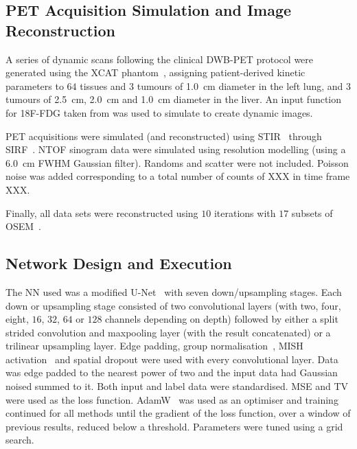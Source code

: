     \subsection{PET Acquisition Simulation and Image Reconstruction} \label{sec:pet_acquisition_simulation_and_image_reconstruction}
        A series of dynamic scans following the clinical \gls{DWB}-\gls{PET} protocol were generated using the \gls{XCAT} phantom~\cite{segars4DXCATPhantom2010}, assigning patient-derived kinetic parameters to $64$ tissues and $3$ tumours of \SI{1.0}{\centi\meter} diameter in the left lung, and $3$ tumours of \SI{2.5}{\centi\meter}, \SI{2.0}{\centi\meter} and \SI{1.0}{\centi\meter} diameter in the liver. An input function for \gls{18F-FDG} taken from \cite{langsjoEffectsSubanestheticKetamine2004} was used to simulate  to create dynamic images.

        \gls{PET} acquisitions were simulated (and reconstructed) using \gls{STIR}~\cite{Thielemans2012} through \gls{SIRF}~\cite{Ovtchinnikov2017}. \gls{NTOF} sinogram data were simulated using resolution modelling (using a \SI{6.0}{\centi\meter} \gls{FWHM} Gaussian filter). Randoms and scatter were not included. Poisson noise was added corresponding to a total number of counts of XXX in time frame XXX.

        Finally, all data sets were reconstructed using $10$ iterations with $17$ subsets of \gls{OSEM}~\cite{Hudson1994}.

    
    \subsection{Network Design and Execution} \label{sec:network_design_and_execution}
        The \gls{NN} used was a modified U-Net~\cite{Weng2015U-Net:Segmentation} with seven down/upsampling stages. Each down or upsampling stage consisted of two convolutional layers (with two, four, eight, $16$, $32$, $64$ or $128$ channels depending on depth) followed by either a split strided convolution and maxpooling layer (with the result concatenated) or a trilinear upsampling layer. Edge padding, group normalisation~\cite{Wu2018GroupNormalization}, MISH activation~\cite{Misra2020Mish:Function} and spatial dropout were used with every convolutional layer. Data was edge padded to the nearest power of two and the input data had Gaussian noised summed to it. Both input and label data were standardised. \gls{MSE} and \gls{TV} were used as the loss function. AdamW~\cite{Loshchilov2017DecoupledRegularization} was used as an optimiser and training continued for all methods until the gradient of the loss function, over a window of previous results, reduced below a threshold. Parameters were tuned using a grid search.
        
